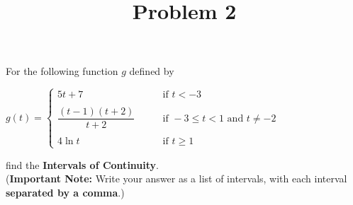 \documentclass{ximera}
\title[Problem 2]{Problem 2}
\begin{document}
\begin{abstract} \end{abstract}
\maketitle

\begin{problem}
For the following function $g$ defined by
	
	$g(t) =   \left\{ \begin{array}{cl}
	5t + 7		 	&	\qquad \text{if } t < -3					\\ \\
	\dfrac{(t-1)(t+2)}{t+2}	&	\qquad \text{if } -3 \leq t < 1 \text{ and } t \neq -2	\\ \\
	4 \ln t				&	\qquad \text{if } t \geq 1					\end{array} \right.  $

  find the \textbf{Intervals of Continuity}.  \\
  (\textbf{Important Note:} Write your answer as a list of intervals, with each interval \textbf{separated by a comma}.)	

\end{problem}
\end{document}
